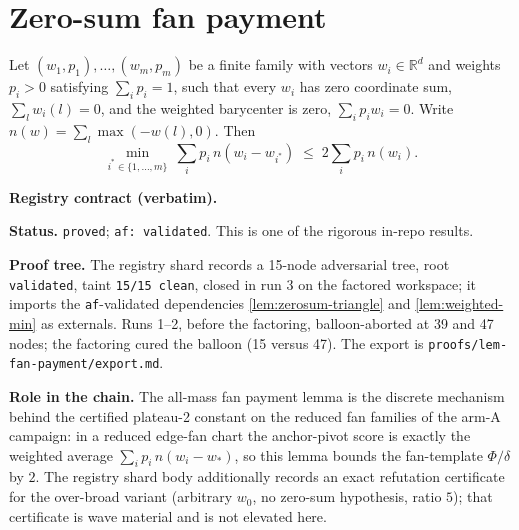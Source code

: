 \section{Zero-sum fan payment}\label{sec:fan-payment}

\begin{lemma}\label{lem:fan-payment}
Let $(w_1,p_1),\dots,(w_m,p_m)$ be a finite family with vectors
$w_i\in\mathbb{R}^d$ and weights $p_i>0$ satisfying $\sum_i p_i=1$, such that
every $w_i$ has zero coordinate sum, $\sum_l w_i(l)=0$, and the weighted
barycenter is zero, $\sum_i p_i w_i=0$. Write $n(w)=\sum_l\max(-w(l),0)$. Then
\[
  \min_{i^{*}\in\{1,\dots,m\}}\ \sum_i p_i\,n(w_i-w_{i^{*}})
    \;\le\;2\sum_i p_i\,n(w_i).
\]
\end{lemma}

\noindent\textbf{Registry contract (verbatim).}

\noindent\textbf{Status.} \texttt{proved}; \texttt{af: validated}.
This is one of the rigorous in-repo results.

\noindent\textbf{Proof tree.} The registry shard records a 15-node
adversarial tree, root \texttt{validated}, taint \texttt{15/15 clean},
closed in run 3 on the factored workspace; it imports the
\texttt{af}-validated dependencies \ref{lem:zerosum-triangle} and
\ref{lem:weighted-min} as externals.  Runs 1--2, before the factoring,
balloon-aborted at 39 and 47 nodes; the factoring cured the balloon
(15 versus 47).  The export is
\texttt{proofs/lem-fan-payment/export.md}.

\noindent\textbf{Role in the chain.} The all-mass fan payment lemma is
the discrete mechanism behind the certified plateau-2 constant on the
reduced fan families of the arm-A campaign: in a reduced edge-fan
chart the anchor-pivot score is exactly the weighted average
$\sum_i p_i\, n(w_i - w_*)$, so this lemma bounds the fan-template
$\Phi/\delta$ by $2$.  The registry shard body additionally records an
exact refutation certificate for the over-broad variant (arbitrary
$w_0$, no zero-sum hypothesis, ratio $5$); that certificate is wave
material and is not elevated here.
